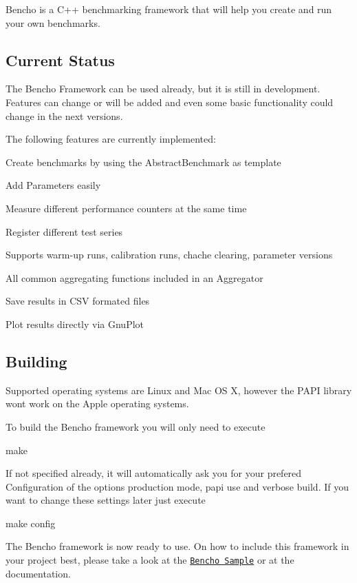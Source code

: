 Bencho is a C++ benchmarking framework that will help you create and run your own benchmarks.

\subsection*{Current Status}

The Bencho Framework can be used already, but it is still in development. Features can change or will be added and even some basic functionality could change in the next versions.

The following features are currently implemented\-:


\begin{DoxyItemize}
\item Create benchmarks by using the Abstract\-Benchmark as template
\item Add Parameters easily
\item Measure different performance counters at the same time
\item Register different test series
\item Supports warm-\/up runs, calibration runs, chache clearing, parameter versions
\item All common aggregating functions included in an Aggregator
\item Save results in C\-S\-V formated files
\item Plot results directly via Gnu\-Plot
\end{DoxyItemize}

\subsection*{Building}

Supported operating systems are Linux and Mac O\-S X, however the P\-A\-P\-I library wont work on the Apple operating systems.

To build the Bencho framework you will only need to execute \begin{DoxyVerb}make
\end{DoxyVerb}


If not specified already, it will automatically ask you for your prefered Configuration of the options production mode, papi use and verbose build. If you want to change these settings later just execute \begin{DoxyVerb}make config
\end{DoxyVerb}


The Bencho framework is now ready to use. On how to include this framework in your project best, please take a look at the \href{https://github.com/schwald/benchosample}{\tt Bencho Sample} or at the documentation.

